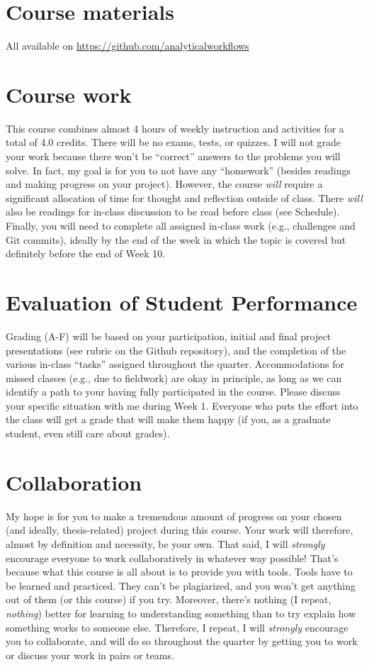 \documentclass[10pt]{article}
\begin{document}
\section*{Course materials}
\noindent
All available on \href{https://github.com/analyticalworkflows}{https://github.com/analyticalworkflows}

\section*{Course work}
This course combines almost 4 hours of weekly instruction and activities for a total of 4.0 credits.
There will be no exams, tests, or quizzes.
I will not grade your work because there won't be ``correct'' answers to the problems you will 
solve.
In fact, my goal is for you to not have any ``homework'' (besides readings and making progress on your 
project).
However, the course \textit{will} require a significant allocation of time for thought and reflection outside 
of class.
There \textit{will} also be readings for in-class discussion to be read before class (see Schedule).
Finally, you will need to complete all assigned in-class work (e.g., challenges and Git commits), ideally 
by the end of the week in which the topic is covered but definitely before the end of Week 10.

\section*{Evaluation of Student Performance}
Grading (A-F) will be based on your participation, 
initial and final project presentations (see rubric on the Github repository), 
and the completion of the various in-class ``tasks'' assigned throughout the quarter.
Accommodations for missed classes (e.g., due to fieldwork) are okay in principle, as long as we can 
identify a path to your having fully participated in the course. 
Please discuss your specific situation with me during Week 1. 
Everyone who puts the effort into the class will get a grade that will make them happy (if you, as a 
graduate student, even still care about grades).

\section*{Collaboration}
My hope is for you to make a tremendous amount of progress on your chosen (and ideally, 
thesis-related) project during this course.
Your work will therefore, almost by definition and necessity, be your own.
That said, I will \textit{strongly} encourage everyone to work collaboratively in whatever way possible!
That's because what this course is all about is to provide you with tools.
Tools have to be learned and practiced.
They can't be plagiarized, and you won't get anything out of them (or this course) if you try.
Moreover, there's nothing (I repeat, \textit{nothing}) better for learning to understanding something than 
to try explain how something works to someone else.
Therefore, I repeat, I will \textit{strongly} encourage you to collaborate, and will do so throughout the 
quarter by getting you to work or discuss your work in pairs or teams.
\end{document}
